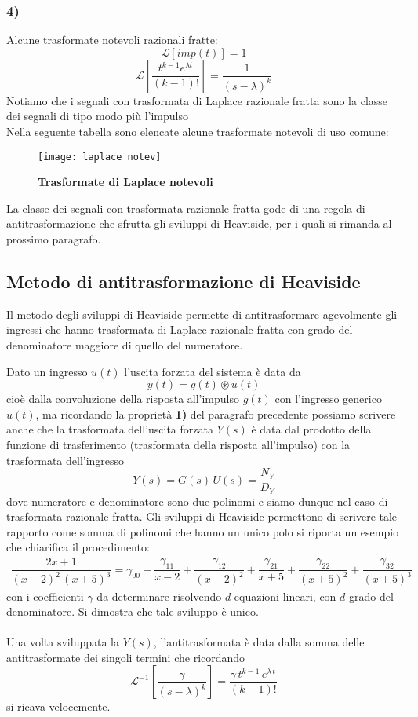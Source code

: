 \documentclass[a4paper]{article}
\begin{document}
	\subsubsection*{4)}
	Alcune trasformate notevoli razionali fratte:
	\[\mathcal{L}[imp(t)]=1\]
	\[\mathcal{L}\left[ \dfrac{t^{k-1}e^{\lambda t}}{(k-1)!}\right]=\dfrac{1}{(s-\lambda)^k}\]
	Notiamo che i segnali con trasformata di Laplace razionale fratta sono la classe dei segnali di tipo modo più l'impulso
	\newline \\
	Nella seguente tabella sono elencate alcune trasformate notevoli di uso comune:
	\begin{figure}[H]
		\centering
		\texttt{[image: laplace notev]}
		\caption{\textbf{Trasformate di Laplace notevoli}}
	\end{figure}
	La classe dei segnali con trasformata razionale fratta gode di una regola di antitrasformazione che sfrutta gli sviluppi di Heaviside, per i quali si rimanda al prossimo paragrafo.
	
	\subsection{Metodo di antitrasformazione di Heaviside}\label{Heaviside}
	Il metodo degli sviluppi di Heaviside permette di antitrasformare agevolmente gli ingressi che hanno trasformata di Laplace razionale fratta con grado del denominatore maggiore di quello del numeratore.
	
	Dato un ingresso $u(t)$ l'uscita forzata del sistema è data da \[y(t)=g(t)\circledast u(t)\] cioè dalla convoluzione della risposta all'impulso $g(t)$ con l'ingresso generico $u(t)$, ma ricordando la proprietà \textbf{1)} del paragrafo precedente possiamo scrivere anche che la trasformata dell'uscita forzata $Y(s)$ è data dal prodotto della funzione di trasferimento (trasformata della risposta all'impulso) con la trasformata dell'ingresso \[Y(s)=G(s)\,U(s)=\dfrac{N_Y}{D_Y}\] dove numeratore e denominatore sono due polinomi e siamo dunque nel caso di trasformata razionale fratta. 
	\newline Gli sviluppi di Heaviside permettono di scrivere tale rapporto come somma di polinomi che hanno un unico polo si riporta un esempio che chiarifica il procedimento:
	\begin{align*}
	\dfrac{2x+1}{(x-2)^2\,(x+5)^3}=\gamma_{00}+\dfrac{\gamma_{11}}{x-2}+\dfrac{\gamma_{12}}{(x-2)^2}+\dfrac{\gamma_{21}}{x+5}+\dfrac{\gamma_{22}}{(x+5)^2}+\dfrac{\gamma_{32}}{(x+5)^3}
	\end{align*} 
	con i coefficienti $\gamma$ da determinare risolvendo $d$ equazioni lineari, con $d$ grado del denominatore. Si dimostra che tale sviluppo è unico.
	\\\\Una volta sviluppata la $Y(s)$, l'antitrasformata è data dalla somma delle antitrasformate dei singoli termini che ricordando \[\mathcal{L}^{-1}\left[\dfrac{\gamma}{(s-\lambda)^k}\right]=\dfrac{\gamma\,t^{k-1}\,e^{\lambda\,t}}{(k-1)!}\]
	si ricava velocemente.
	
	
\end{document}
